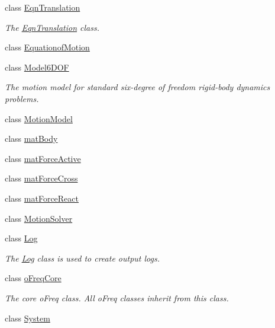 \begin{DoxyCompactItemize}
class \hyperlink{classosea_1_1ofreq_1_1_eqn_translation}{Eqn\-Translation}
\begin{DoxyCompactList}\small\item\em The \hyperlink{classosea_1_1ofreq_1_1_eqn_translation}{Eqn\-Translation} class. \end{DoxyCompactList}\item 
class \hyperlink{classosea_1_1ofreq_1_1_equationof_motion}{Equationof\-Motion}
\item 
class \hyperlink{classosea_1_1ofreq_1_1_model6_d_o_f}{Model6\-D\-O\-F}
\begin{DoxyCompactList}\small\item\em The motion model for standard six-\/degree of freedom rigid-\/body dynamics problems. \end{DoxyCompactList}\item 
class \hyperlink{classosea_1_1ofreq_1_1_motion_model}{Motion\-Model}
\item 
class \hyperlink{classosea_1_1ofreq_1_1mat_body}{mat\-Body}
\item 
class \hyperlink{classosea_1_1ofreq_1_1mat_force_active}{mat\-Force\-Active}
\item 
class \hyperlink{classosea_1_1ofreq_1_1mat_force_cross}{mat\-Force\-Cross}
\item 
class \hyperlink{classosea_1_1ofreq_1_1mat_force_react}{mat\-Force\-React}
\item 
class \hyperlink{classosea_1_1ofreq_1_1_motion_solver}{Motion\-Solver}
\item 
class \hyperlink{classosea_1_1ofreq_1_1_log}{Log}
\begin{DoxyCompactList}\small\item\em The \hyperlink{classosea_1_1ofreq_1_1_log}{Log} class is used to create output logs. \end{DoxyCompactList}\item 
class \hyperlink{classosea_1_1ofreq_1_1o_freq_core}{o\-Freq\-Core}
\begin{DoxyCompactList}\small\item\em The core o\-Freq class. All o\-Freq classes inherit from this class. \end{DoxyCompactList}\item 
class \hyperlink{classosea_1_1ofreq_1_1_system}{System}
\end{DoxyCompactItemize}
